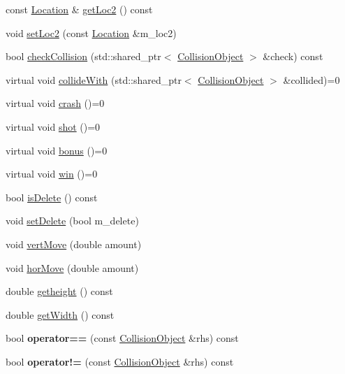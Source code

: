 \begin{DoxyCompactItemize}
const \hyperlink{classroadfighter_1_1Location}{Location} \& \hyperlink{classroadfighter_1_1CollisionObject_aa7412cf56663bc98b1454a8ae54ac2b0}{get\+Loc2} () const
\item 
void \hyperlink{classroadfighter_1_1CollisionObject_a8f566d1ea28f2ed16723572617abd583}{set\+Loc2} (const \hyperlink{classroadfighter_1_1Location}{Location} \&m\+\_\+loc2)
\item 
bool \hyperlink{classroadfighter_1_1CollisionObject_a426a06907212c866a22cba7ec84ebe65}{check\+Collision} (std\+::shared\+\_\+ptr$<$ \hyperlink{classroadfighter_1_1CollisionObject}{Collision\+Object} $>$ \&check) const
\item 
virtual void \hyperlink{classroadfighter_1_1CollisionObject_a7eafa2fdc4463788b816fdd9370d28d9}{collide\+With} (std\+::shared\+\_\+ptr$<$ \hyperlink{classroadfighter_1_1CollisionObject}{Collision\+Object} $>$ \&collided)=0
\item 
virtual void \hyperlink{classroadfighter_1_1CollisionObject_a18f0f60a5a664d6fb554daac0d398a2c}{crash} ()=0
\item 
virtual void \hyperlink{classroadfighter_1_1CollisionObject_a338a1071e6d5e25439e57c8673308dbb}{shot} ()=0
\item 
virtual void \hyperlink{classroadfighter_1_1CollisionObject_a157e499c27619ceefd6179a459fafd90}{bonus} ()=0
\item 
virtual void \hyperlink{classroadfighter_1_1CollisionObject_a03ce1ae52676088839d85c597743052c}{win} ()=0
\item 
bool \hyperlink{classroadfighter_1_1CollisionObject_a2891183d9769adbc9a9c0dc65db1af10}{is\+Delete} () const
\item 
void \hyperlink{classroadfighter_1_1CollisionObject_a454547da963cd4d7e09f57bc64a0f984}{set\+Delete} (bool m\+\_\+delete)
\item 
void \hyperlink{classroadfighter_1_1CollisionObject_aaf92d0fe335daa016b5131835602bc1d}{vert\+Move} (double amount)
\item 
void \hyperlink{classroadfighter_1_1CollisionObject_a907fbb9f4a45996690b4f35bc4256e47}{hor\+Move} (double amount)
\item 
double \hyperlink{classroadfighter_1_1CollisionObject_a0c83b40afb7be4ed3b501a79c2a81b9b}{getheight} () const
\item 
double \hyperlink{classroadfighter_1_1CollisionObject_ab8692ffb0324d39a96f31c780f7a8172}{get\+Width} () const
\item 
\mbox{\label{classroadfighter_1_1CollisionObject_ad93e53a2b4fdc7c7882a566b74cecfad}} 
bool {\bfseries operator==} (const \hyperlink{classroadfighter_1_1CollisionObject}{Collision\+Object} \&rhs) const
\item 
\mbox{\label{classroadfighter_1_1CollisionObject_ada8d62684274b10fc4f19e441413da23}} 
bool {\bfseries operator!=} (const \hyperlink{classroadfighter_1_1CollisionObject}{Collision\+Object} \&rhs) const
\end{DoxyCompactItemize}


